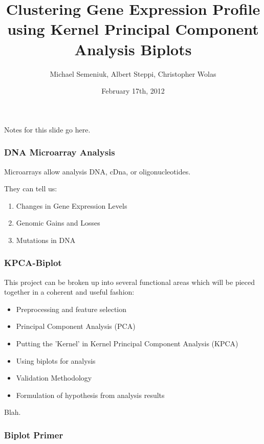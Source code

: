 \documentclass[serif ]{beamer}
\title{Clustering Gene Expression Profile using Kernel Principal Component Analysis Biplots}
\author{Michael Semeniuk, Albert Steppi, Christopher Wolas}
\date{February 17th, 2012}
\begin{document}
	\maketitle

	\note
	{
		Notes for this slide go here.
	}
	
	\begin{frame}
	\frametitle{DNA Microarray Analysis}

		Microarrays allow analysis DNA, cDna, or oligonucleotides.\newline

		They can tell us:
		\begin{enumerate}
			\item Changes in Gene Expression Levels
			\item Genomic Gains and Losses
			\item Mutations in DNA
		\end{enumerate}


	\note
	{
	}
	\end{frame}
	
	\begin{frame}
		\frametitle{KPCA-Biplot}

		This project can be broken up into several functional areas which will be pieced together in a coherent and useful fashion:

		\begin{itemize}
			\item Preprocessing and feature selection 
			\item Principal Component Analysis (PCA)
			\item Putting the 'Kernel' in Kernel Principal Component Analysis (KPCA)
			\item Using biplots for analysis
			\item Validation Methodology
			\item Formulation of hypothesis from analysis results
		\end{itemize} 

		\note
		{
			Blah.
		}

	\end{frame}

	\begin{frame} \frametitle{Biplot Primer} \begin{center}  \end{center} \end{frame}
\end{document}
